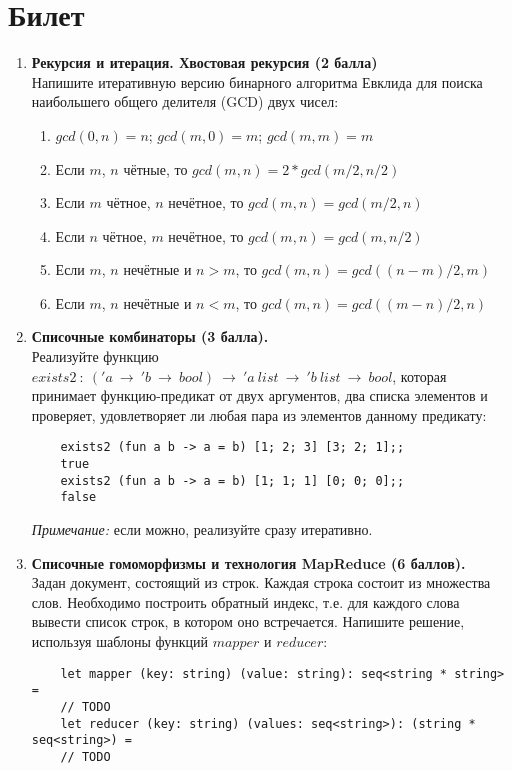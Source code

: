 \documentclass[a4paper,11pt]{article}
\renewcommand{\emph}[1]{\textit{#1}}
\newcommand{\<}{\langle}
\renewcommand{\>}{\rangle}
\begin{document}
\section*{Билет }
\begin{enumerate}
\item \textbf{Рекурсия и итерация. Хвостовая рекурсия (2 балла)}\\
  Напишите итеративную версию бинарного алгоритма Евклида для поиска
  наибольшего общего делителя (GCD) двух чисел:
  \begin{enumerate}
  \item $gcd(0, n) = n$; $gcd(m, 0) = m$; $gcd(m, m) = m$
  \item Если $m$, $n$ чётные, то $gcd(m, n) = 2*gcd(m/2, n/2)$
  \item Если $m$ чётное, $n$ нечётное, то $gcd(m, n) = gcd(m/2, n)$
  \item Если $n$ чётное, $m$ нечётное, то $gcd(m, n) = gcd(m, n/2)$
  \item Если $m$, $n$ нечётные и $n > m$, то $gcd(m, n) = gcd((n - m)/2, m)$
  \item Если $m$, $n$ нечётные и $n < m$, то $gcd(m, n) = gcd((m - n)/2, n)$
  \end{enumerate}

\item \textbf{Списочные комбинаторы (3 балла).} \\
  Реализуйте функцию
  $exists2~:~('\!a~\rightarrow~'\!b~\rightarrow~bool)~\rightarrow~'\!a~list~
  \rightarrow~'\!b~list~\rightarrow~bool$,
  которая принимает функцию-предикат от двух аргументов, два списка элементов
  и проверяет, удовлетворяет ли любая пара из элементов данному предикату:
  \begin{lstlisting}
    exists2 (fun a b -> a = b) [1; 2; 3] [3; 2; 1];;
    true
    exists2 (fun a b -> a = b) [1; 1; 1] [0; 0; 0];;
    false
  \end{lstlisting}
  \emph{Примечание:} если можно, реализуйте сразу итеративно.

\item \textbf{Списочные гомоморфизмы и технология MapReduce (6 баллов).}\\
  Задан документ, состоящий из строк. Каждая строка состоит из множества
  слов. Необходимо построить обратный индекс, т.е. для каждого слова вывести
  список строк, в котором оно встречается. Напишите решение, используя шаблоны
  функций $mapper$ и $reducer$:
  \begin{lstlisting}
    let mapper (key: string) (value: string): seq<string * string> =
    // TODO
    let reducer (key: string) (values: seq<string>): (string * seq<string>) =
    // TODO
  \end{lstlisting}
\end{enumerate}
\newpage
\end{document}
